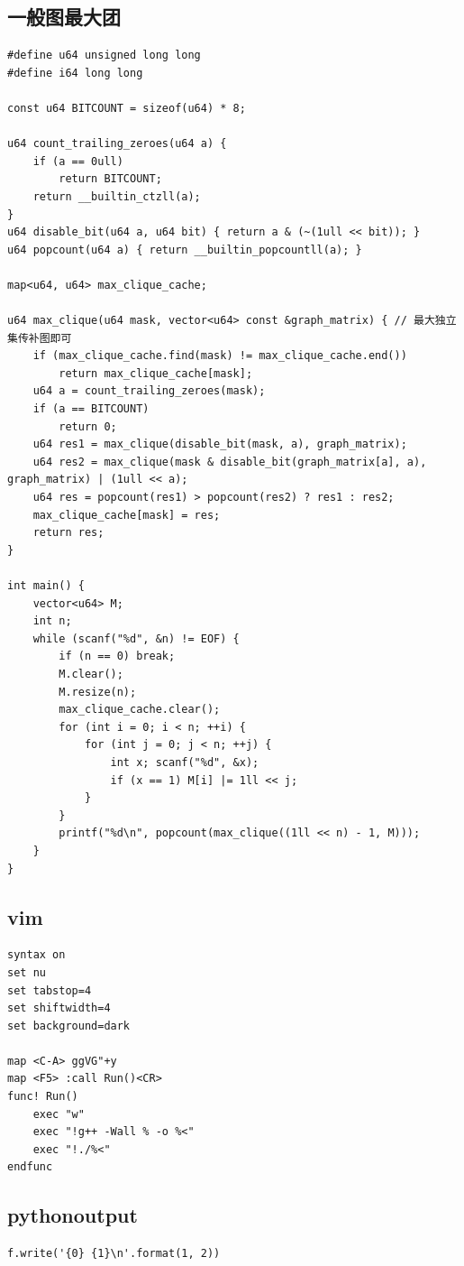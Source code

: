 \documentclass[twoside]{article}
\begin{document}
\subsection{一般图最大团}
\begin{lstlisting}
#define u64 unsigned long long
#define i64 long long

const u64 BITCOUNT = sizeof(u64) * 8;

u64 count_trailing_zeroes(u64 a) {
    if (a == 0ull)
        return BITCOUNT;
    return __builtin_ctzll(a);
}
u64 disable_bit(u64 a, u64 bit) { return a & (~(1ull << bit)); }
u64 popcount(u64 a) { return __builtin_popcountll(a); }

map<u64, u64> max_clique_cache;

u64 max_clique(u64 mask, vector<u64> const &graph_matrix) { // 最大独立集传补图即可
    if (max_clique_cache.find(mask) != max_clique_cache.end())
        return max_clique_cache[mask];
    u64 a = count_trailing_zeroes(mask);
    if (a == BITCOUNT)
        return 0;
    u64 res1 = max_clique(disable_bit(mask, a), graph_matrix);
    u64 res2 = max_clique(mask & disable_bit(graph_matrix[a], a), graph_matrix) | (1ull << a);
    u64 res = popcount(res1) > popcount(res2) ? res1 : res2;
    max_clique_cache[mask] = res;
    return res;
}

int main() {
    vector<u64> M;
    int n;
    while (scanf("%d", &n) != EOF) {
        if (n == 0) break;
        M.clear();
        M.resize(n);
        max_clique_cache.clear();
        for (int i = 0; i < n; ++i) {
            for (int j = 0; j < n; ++j) {
                int x; scanf("%d", &x);
                if (x == 1) M[i] |= 1ll << j;
            }
        }
        printf("%d\n", popcount(max_clique((1ll << n) - 1, M)));
    }
}\end{lstlisting}
\subsection{vim}
\begin{lstlisting}
syntax on
set nu
set tabstop=4
set shiftwidth=4
set background=dark

map <C-A> ggVG"+y
map <F5> :call Run()<CR>
func! Run()
	exec "w"
	exec "!g++ -Wall % -o %<"
	exec "!./%<"
endfunc\end{lstlisting}
\subsection{pythonoutput}
\begin{lstlisting}
f.write('{0} {1}\n'.format(1, 2))\end{lstlisting}
\end{document}

